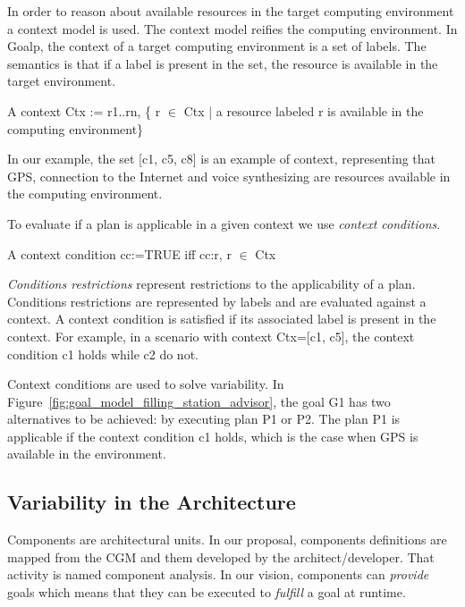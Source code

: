 In order to reason about available resources in the target computing environment a context model is used. The context model reifies the computing environment.
In Goalp, the context of a target computing environment is a set of labels. The semantics is that if a label is present in the set, the resource is available in the target environment.

\begin{defn}[Context]

  A context Ctx := r1..rn, \{ r $\in$ Ctx | a resource labeled r is available in the computing environment\}
\end{defn}

In our example, the set
[c1, c5, c8] is an example of context, representing that GPS, connection to the Internet and voice synthesizing are resources available in the computing environment.

To evaluate if a plan is applicable in a given context we use \emph{context conditions}.

\begin{defn}
  A context condition cc:=TRUE iff cc:r, r $\in$ Ctx
\end{defn}

\emph{Conditions restrictions} represent restrictions to the applicability of a plan. Conditions restrictions are represented by labels and are evaluated against a context.
A context condition is satisfied if its associated label is present in the context. For example, in a scenario with context Ctx=[c1, c5], the context condition c1 holds while c2 do not.

Context conditions are used to solve variability. In Figure~\ref{fig:goal_model_filling_station_advisor}, the goal G1 has two alternatives to be achieved: by executing plan P1 or P2. The plan P1 is applicable if the context condition c1 holds, which is the case when GPS is available in the environment.

\subsection{Variability in the Architecture}

\label{sec:goals_components}
Components are architectural units. In our proposal, components definitions are mapped from the CGM and them developed by the architect/developer. That activity is named component analysis. In our vision, components can \emph{provide} goals which means that they can be executed to \emph{fulfill} a goal at runtime.

